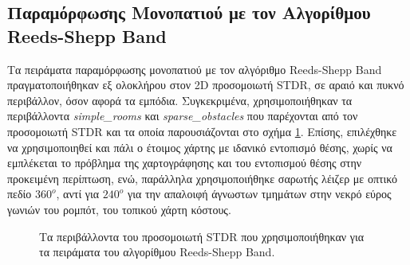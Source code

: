\subsection{Παραμόρφωσης Μονοπατιού με τον Αλγορίθμου Reeds-Shepp Band}\label{ssec:rsband_experiments}
Τα πειράματα παραμόρφωσης μονοπατιού με τον αλγόριθμο Reeds-Shepp Band πραγματοποιήθηκαν εξ ολοκλήρου στον 2D προσομοιωτή STDR, σε αραιό και πυκνό περιβάλλον, όσον αφορά τα εμπόδια. Συγκεκριμένα, χρησιμοποιήθηκαν τα περιβάλλοντα  \textit{simple{\_}rooms} και \textit{sparse{\_}obstacles} που παρέχονται από τον προσομοιωτή STDR και τα οποία παρουσιάζονται στο σχήμα \ref{fig:rsband_stdr_environments}. Επίσης, επιλέχθηκε να χρησιμοποιηθεί και πάλι ο έτοιμος χάρτης με ιδανικό εντοπισμό θέσης, χωρίς να εμπλέκεται το πρόβλημα της χαρτογράφησης και του εντοπισμού θέσης στην προκειμένη περίπτωση, ενώ, παράλληλα χρησιμοποιήθηκε σαρωτής λέιζερ με οπτικό πεδίο $360^o$, αντί για $240^o$ για την απαλοιφή άγνωστων τμημάτων στην νεκρό εύρος γωνιών του ρομπότ, του τοπικού χάρτη κόστους.

\begin{figure}[!ht]
	\centering
	\hspace{0.1\linewidth}
	\caption{Τα περιβάλλοντα του προσομοιωτή STDR που χρησιμοποιήθηκαν για τα πειράματα του αλγορίθμου Reeds-Shepp Band.}
	\label{fig:rsband_stdr_environments}
\end{figure}

